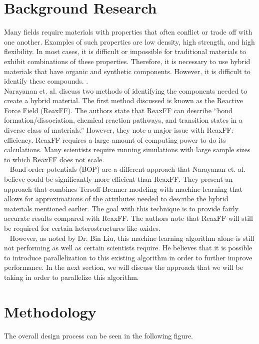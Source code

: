 \documentclass[letterpaper, 12pt]{article}
\begin{document}
\begin{flushleft}

\section*{Background Research}
Many fields require materials with properties that often conflict or trade off with one another.  Examples of such properties are low density, high strength, and high flexibility.  In most cases, it is difficult or impossible for traditional materials to exhibit combinations of these properties. Therefore, it is necessary to use hybrid materials that have organic and synthetic components. However, it is difficult to identify these compounds. \cite{C7NR06038F}.\\

Narayanan et. al. discuss two methods of identifying the components needed to create a hybrid material. The first
method discussed is known as the Reactive Force Field (ReaxFF). The authors state that ReaxFF can describe ``bond formation/dissociation, chemical reaction pathways, and transition states in a diverse class of materials.'' However, they note a major issue with ReaxFF: efficiency. ReaxFF requires a large amount of computing power to do its calculations. Many scientists require running simulations with large sample sizes to which ReaxFF does not scale. \\
~\newline
Bond order potentials (BOP) are a different approach that Narayanan et. al. believe could be significantly more
efficient than ReaxFF. They present an approach that combines Tersoff-Brenner modeling with machine learning that
allows for approximations of the attributes needed to describe the hybrid materials mentioned earlier. The goal
with this technique is to provide fairly accurate results compared with ReaxFF. The authors note that
ReaxFF will still be required for certain heterostructures like oxides. \\
~\newline
However, as noted by Dr. Bin Liu, this machine learning algorithm alone is still not performing as well as 
certain scientists require. He believes that it is possible to introduce parallelization to this existing
algorithm in order to further improve performance. In the next section, we will discuss the approach that we
will be taking in order to parallelize this algorithm. 

\section*{Methodology}
 The overall design process can be seen in the following figure.


\end{flushleft}
\end{document}
